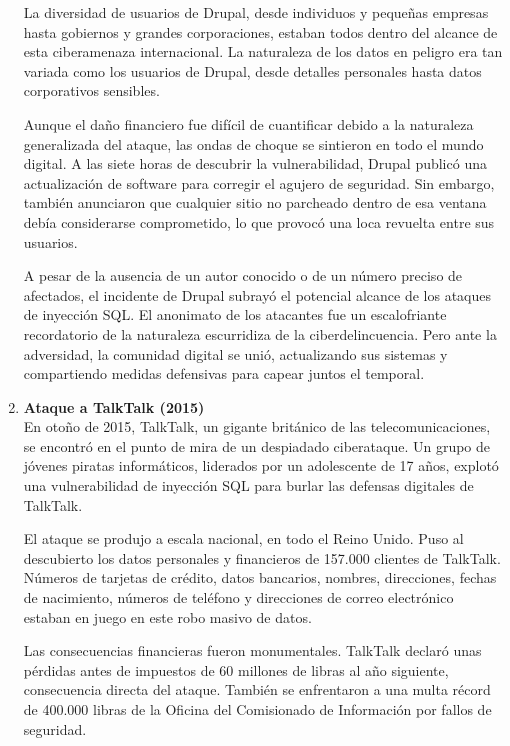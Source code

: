 \documentclass[11pt]{report}
\begin{document}
\begin{enumerate}
  La diversidad de usuarios de Drupal, desde individuos y pequeñas empresas hasta gobiernos y grandes corporaciones, estaban todos dentro del alcance
  de esta ciberamenaza internacional. La naturaleza de los datos en peligro era tan variada como los usuarios de Drupal, desde detalles personales hasta
  datos corporativos sensibles.

  Aunque el daño financiero fue difícil de cuantificar debido a la naturaleza generalizada del ataque, las ondas de choque se sintieron en todo el mundo
  digital. A las siete horas de descubrir la vulnerabilidad, Drupal publicó una actualización de software para corregir el agujero de seguridad. Sin embargo,
  también anunciaron que cualquier sitio no parcheado dentro de esa ventana debía considerarse comprometido, lo que provocó una loca revuelta entre sus usuarios.
    
  A pesar de la ausencia de un autor conocido o de un número preciso de afectados, el incidente de Drupal subrayó el potencial alcance de los ataques de inyección SQL.
  El anonimato de los atacantes fue un escalofriante recordatorio de la naturaleza escurridiza de la ciberdelincuencia. Pero ante la adversidad, la comunidad digital 
  se unió, actualizando sus sistemas y compartiendo medidas defensivas para capear juntos el temporal.

  \item \textbf{Ataque a TalkTalk (2015)} \\
  En otoño de 2015, TalkTalk, un gigante británico de las telecomunicaciones, se encontró en el punto de mira de un despiadado ciberataque. Un grupo de jóvenes piratas
  informáticos, liderados por un adolescente de 17 años, explotó una vulnerabilidad de inyección SQL para burlar las defensas digitales de TalkTalk.

  El ataque se produjo a escala nacional, en todo el Reino Unido. Puso al descubierto los datos personales y financieros de 157.000 clientes de TalkTalk. Números de 
  tarjetas de crédito, datos bancarios, nombres, direcciones, fechas de nacimiento, números de teléfono y direcciones de correo electrónico estaban en juego en este 
  robo masivo de datos.

  Las consecuencias financieras fueron monumentales. TalkTalk declaró unas pérdidas antes de impuestos de 60 millones de libras al año siguiente, consecuencia directa
  del ataque. También se enfrentaron a una multa récord de 400.000 libras de la Oficina del Comisionado de Información por fallos de seguridad.


\end{enumerate}
\end{document}
